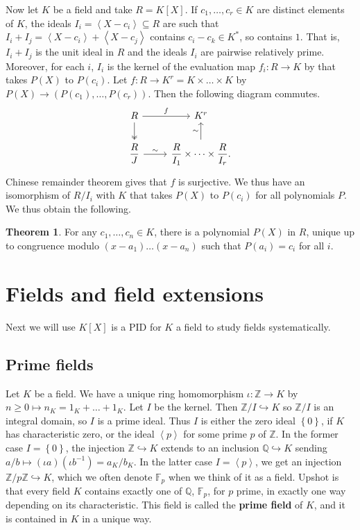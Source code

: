 \documentclass{article}
\newcommand{\F}{\mathbb{F}}
\newcommand{\Z}{\mathbb{Z}}
\newcommand{\Q}{\mathbb{Q}}
\newcommand{\rb}[1]{\left( #1 \right)}
\renewcommand{\sb}[1]{\left[ #1 \right]}
\newcommand{\cb}[1]{\left\{ #1 \right\}}
\newcommand{\ab}[1]{\left\langle #1 \right\rangle}
\theoremstyle{definition}\newtheorem{definition}{Definition}[section]
\theoremstyle{definition}\newtheorem{remark}[definition]{Remark}
\theoremstyle{definition}\newtheorem*{example}{Example}
\theoremstyle{definition}\newtheorem*{note}{Note}
\newtheorem{theorem}[definition]{Theorem}
\begin{document}
Now let $ K $ be a field and take $ R = K\sb{X} $. If $ c_1, \dots, c_r \in K $ are distinct elements of $ K $, the ideals $ I_i = \ab{X - c_i} \subseteq R $ are such that $ I_i + I_j = \ab{X - c_i} + \ab{X - c_j} $ contains $ c_i - c_k \in K^* $, so contains $ 1 $. That is, $ I_i + I_j $ is the unit ideal in $ R $ and the ideals $ I_i $ are pairwise relatively prime. Moreover, for each $ i $, $ I_i $ is the kernel of the evaluation map $ f_i : R \to K $ by that takes $ P\rb{X} $ to $ P\rb{c_i} $. Let $ f : R \to K^r = K \times \dots \times K $ by $ P\rb{X} \to \rb{P\rb{c_1}, \dots, P\rb{c_r}} $. Then the following diagram commutes.
$$
\begin{tikzcd}
R \arrow{r}{f} \arrow[two heads]{d} & K^r \\
\dfrac{R}{J} \arrow{r}{\sim} & \dfrac{R}{I_1} \times \dots \times \dfrac{R}{I_r} \arrow{u}{\sim}.
\end{tikzcd}
$$
Chinese remainder theorem gives that $ f $ is surjective. We thus have an isomorphism of $ R / I_i $ with $ K $ that takes $ P\rb{X} $ to $ P\rb{c_i} $ for all polynomials $ P $. We thus obtain the following.

\begin{theorem}
For any $ c_1, \dots, c_n \in K $, there is a polynomial $ P\rb{X} $ in $ R $, unique up to congruence modulo $ \rb{x - a_1} \dots \rb{x - a_n} $ such that $ P\rb{a_i} = c_i $ for all $ i $.
\end{theorem}


\section{Fields and field extensions}

Next we will use $ K\sb{X} $ is a PID for $ K $ a field to study fields systematically.

\subsection{Prime fields}

Let $ K $ be a field. We have a unique ring homomorphism $ \iota : \Z \to K $ by $ n \ge 0 \mapsto n_K = 1_K + \dots + 1_K $. Let $ I $ be the kernel. Then $ \Z / I \hookrightarrow K $ so $ \Z / I $ is an integral domain, so $ I $ is a prime ideal. Thus $ I $ is either the zero ideal $ \cb{0} $, if $ K $ has characteristic zero, or the ideal $ \ab{p} $ for some prime $ p $ of $ \Z $. In the former case $ I = \cb{0} $, the injection $ \Z \hookrightarrow K $ extends to an inclusion $ \Q \hookrightarrow K $ sending $ a / b \mapsto \rb{\iota a}\rb{\iota b^{-1}} = a_K / b_K $. In the latter case $ I = \ab{p} $, we get an injection $ \Z / p\Z \hookrightarrow K $, which we often denote $ \F_p $ when we think of it as a field. Upshot is that every field $ K $ contains exactly one of $ \Q $, $ \F_p $, for $ p $ prime, in exactly one way depending on its characteristic. This field is called the \textbf{prime field} of $ K $, and it is contained in $ K $ in a unique way.
\end{document}
